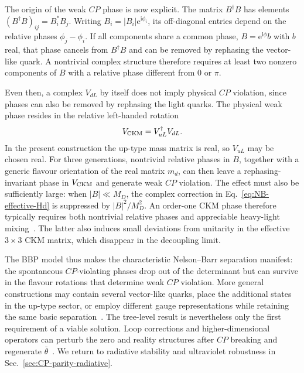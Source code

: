 \documentclass[review]{elsarticle}
\numberwithin{equation}{section}
\numberwithin{table}{section}
\numberwithin{figure}{section}
\def\i{\mathrm{i}}
\def\e{\mathrm{e}}
\begin{document}
The origin of the weak $CP$ phase is now explicit. The matrix $B^\dagger B$ has elements
$(B^\dagger B)_{ij}=B_i^*B_j$. Writing $B_i=|B_i|\e^{\i\phi_i}$, its off-diagonal entries depend on the relative phases $\phi_j-\phi_i$. If all components share a common phase, $B=\e^{\i\phi}b$ with $b$ real, that phase cancels from $B^\dagger B$ and can be removed by rephasing the vector-like quark. A nontrivial complex structure therefore requires at least two nonzero components of $B$ with a relative phase different from $0$ or $\pi$.

Even then, a complex $V_{dL}$ by itself does not imply physical $CP$ violation, since phases can also be removed by rephasing the light quarks. The physical weak phase resides in the relative left-handed rotation
\begin{align}
    V_{\rm CKM} = V_{uL}^\dagger V_{dL}.
    \label{eq:NB-CKM}
\end{align}
In the present construction the up-type mass matrix is real, so $V_{uL}$ may be chosen real. For three generations, nontrivial relative phases in $B$, together with a generic flavour orientation of the real matrix $m_d$, can then leave a rephasing-invariant phase in $V_{\rm CKM}$ and generate weak $CP$ violation. The effect must also be sufficiently large: when $|B|\ll M_D$, the complex correction in Eq.~\eqref{eq:NB-effective-Hd} is suppressed by $|B|^2/M_D^2$. An order-one CKM phase therefore typically requires both nontrivial relative phases and appreciable heavy-light mixing~\cite{Dine:2015jga,Valenti:2021xjp}. The latter also induces small deviations from unitarity in the effective $3\times3$ CKM matrix, which disappear in the decoupling limit.

The BBP model thus makes the characteristic Nelson--Barr separation manifest: the spontaneous $CP$-violating phases drop out of the determinant but can survive in the flavour rotations that determine weak $CP$ violation. More general constructions may contain several vector-like quarks, place the additional states in the up-type sector, or employ different gauge representations while retaining the same basic separation~\cite{Barr:1984qx,Barr:1984fh,Vecchi:2014hpa,Valenti:2021xjp}. The tree-level result is nevertheless only the first requirement of a viable solution. Loop corrections and higher-dimensional operators can perturb the zero and reality structures after $CP$ breaking and regenerate $\bar\theta$~\cite{Bento:1991ez,Dine:2015jga,Vecchi:2014hpa}. We return to radiative stability and ultraviolet robustness in Sec.~\ref{sec:CP-parity-radiative}.
\end{document}
